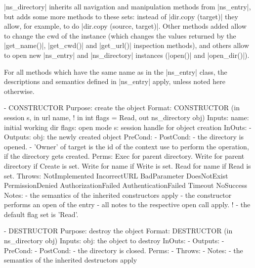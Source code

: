     |ns_directory| inherits all navigation and manipulation
    methods from |ns_entry|, but adds some more methods to these
    sets: instead of |dir.copy (target)| they allow, for
    example, to do |dir.copy (source, target)|.  Other methods
    added allow to change the cwd of the instance (which changes
    the values returned by the |get_name()|, |get_cwd()| and
    |get_url()| inspection methods), and others allow to open
    new |ns_entry| and |ns_directory| instances (|open()| and
    |open_dir()|).
 
    For all methods which have the same name as in the
    |ns_entry| class, the descriptions and semantics defined in
    |ns_entry| apply, unless noted here otherwise.
 
 
 \begin{myspec}
    - CONSTRUCTOR
      Purpose:  create the object
      Format:   CONSTRUCTOR          (in  session   s,
                                      in  url       name,
!                                     in  int       flags = Read,
                                      out ns_directory obj)
      Inputs:   name:                 initial working dir
                flags:                open mode
                s:                    session handle for
                                      object creation
      InOuts:   -
      Outputs:  obj:                  the newly created object
      PreCond:  -
      PostCond: - the directory is opened.
                - 'Owner' of target is the id of the context
                  use to perform the operation, if the
                  directory gets created.
      Perms:    Exec  for parent directory.
                Write for parent directory if Create is set.
                Write for name if Write is set.
                Read  for name if Read  is set.
      Throws:   NotImplemented
                IncorrectURL
                BadParameter
                DoesNotExist
                PermissionDenied
                AuthorizationFailed
                AuthenticationFailed
                Timeout
                NoSuccess
      Notes:    - the semantics of the inherited constructors
                  apply
                - the constructor performs an open of the 
                  entry - all notes to the respective open 
                  call apply.
!               - the default flag set is 'Read'.
 
 
    - DESTRUCTOR
      Purpose:  destroy the object
      Format:   DESTRUCTOR           (in  ns_directory obj)
      Inputs:   obj:                  the object to destroy
      InOuts:   -
      Outputs:  -
      PreCond:  -
      PostCond: - the directory is closed.
      Perms:    -
      Throws:   - 
      Notes:    - the semantics of the inherited destructors
                  apply
 

\end{myspec}
